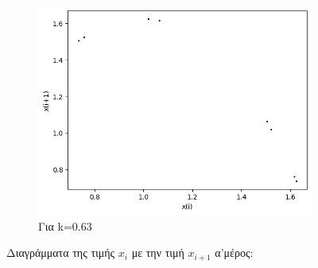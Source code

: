 \begin{figure}[h!]
\begin{subfigure}[b]{0.4\textwidth}
		\includegraphics[width=\textwidth]{LateX images/graphs q09/g13}
		\caption{Για k=0.63}
		\label{f:k52}
	\end{subfigure}
	\hfill
	\caption{Διαγράμματα της τιμής \(x_i\) με την τιμή \(x_{i+1}\) α'μέρος:}
\end{figure}
